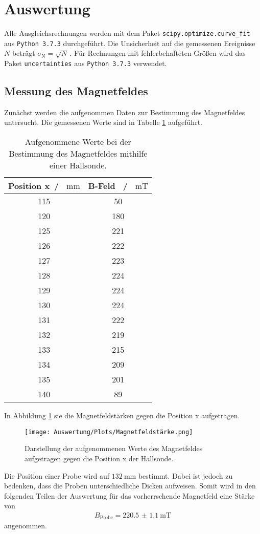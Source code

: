\section{Auswertung}
Alle Ausgleichsrechnungen werden mit dem Paket \texttt{scipy.optimize.curve\_fit}  aus \texttt{Python 3.7.3} durchgeführt.
Die Unsicherheit auf die gemessenen Ereignisse $N$ beträgt $\sigma_\text{N} = \sqrt{N}\,$.
Für Rechnungen mit fehlerbehafteten Größen wird das Paket \texttt{uncertainties} aus \texttt{Python 3.7.3} verwendet.

\subsection{Messung des Magnetfeldes}
Zunächst werden die aufgenommen Daten zur Bestimmung des Magnetfeldes untersucht. Die gemessenen Werte
sind in Tabelle \ref{tab:MF_Messung} aufgeführt.
\begin{table}[H]
    \centering
    \caption{Aufgenommene Werte bei der Bestimmung des Magnetfeldes mithilfe einer Hallsonde.}
    \label{tab:MF_Messung}
    \begin{tabular}{cc}
      \toprule
      Position x\, / \, $\si{\milli\meter}$ & B-Feld \, / \, $\si{\milli\tesla}$  \\
      \midrule
      115 & 50  \\
      120 & 180 \\
      125 & 221 \\
      126 & 222 \\
      127 & 223 \\
      128 & 224 \\
      129 & 224 \\
      130 & 224 \\
      131 & 222 \\
      132 & 219 \\
      133 & 215 \\
      134 & 209 \\
      135 & 201 \\
      140 & 89  \\
      \bottomrule
  \end{tabular}
 \end{table} \noindent
 In Abbildung \ref{fig:MF_Messung} sie die Magnetfeldstärken gegen die Position x aufgetragen.
 \begin{figure}[H]
     \centering
     \texttt{[image: Auswertung/Plots/Magnetfeldstärke.png]}
     \caption{Darstellung der aufgenommenen Werte des Magnetfeldes aufgetragen gegen die Position x der Hallsonde.}
     \label{fig:MF_Messung}
 \end{figure} \noindent
 Die Position einer Probe wird auf $\SI{132}{\milli\meter}$ bestimmt. Dabei ist jedoch zu bedenken,
 dass die Proben unterschiedliche Dicken aufweisen.
 Somit wird in den folgenden Teilen der Auswertung für das vorherrschende Magnetfeld eine Stärke von
 \begin{align*}
     B_\text{Probe} = \SI{220.5(11)}{\milli\tesla}
 \end{align*} \noindent
 angenommen.

